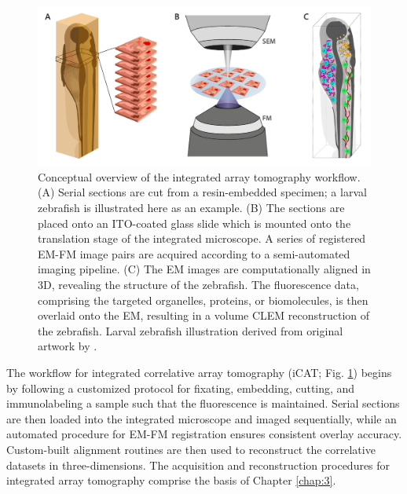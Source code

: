 \begin{figure}[!tb]
    \centering
    \includegraphics[width=\linewidth]{chapter-1/figures/fig1_iCAT_v2.pdf}
    \caption{Conceptual overview of the integrated array tomography workflow.
    (A) Serial sections are cut from a resin-embedded specimen; a larval zebrafish is illustrated here as an example.%
    (B) The sections are placed onto an ITO-coated glass slide which is mounted onto the translation stage of the integrated microscope. A series of registered EM-FM image pairs are acquired according to a semi-automated imaging pipeline.
    (C) The EM images are computationally aligned in 3D, revealing the structure of the zebrafish. The fluorescence data, comprising the targeted organelles, proteins, or biomolecules, is then overlaid onto the EM, resulting in a volume CLEM reconstruction of the zebrafish.
    Larval zebrafish illustration derived from original artwork by \textcite{griffiths2013how}.}
    \label{fig:1.1_icat}
\end{figure}

The workflow for integrated correlative array tomography (iCAT; Fig. \ref{fig:1.1_icat}) begins by following a customized protocol for fixating, embedding, cutting, and immunolabeling a sample such that the fluorescence is maintained. Serial sections are then loaded into the integrated microscope and imaged sequentially, while an automated procedure for EM-FM registration \cite{haring2017automated} ensures consistent overlay accuracy. Custom-built alignment routines are then used to reconstruct the correlative datasets in three-dimensions. The acquisition and reconstruction procedures for integrated array tomography comprise the basis of Chapter \ref{chap:3}.

